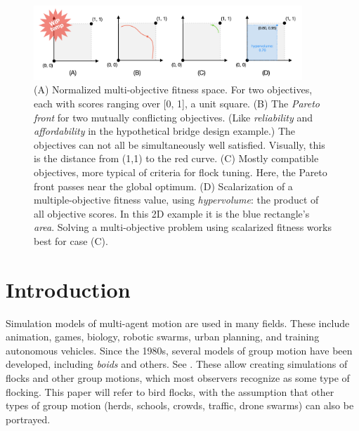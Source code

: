 \documentclass[letterpaper]{article}
\begin{document}


\begin{figure}[t]
    \centering
    \includegraphics[width=0.9\textwidth]{images/temp_MOF_HV.png}
    \caption{(A) Normalized multi-objective fitness space. For two objectives, each with scores ranging over [0, 1], a unit square. (B) The \textit{Pareto front} for two mutually conflicting objectives. (Like \textit{reliability} and \textit{affordability} in the hypothetical bridge design example.) The objectives can not all be simultaneously well satisfied. Visually, this is the distance from (1,1) to the red curve. (C) Mostly compatible objectives, more typical of criteria for flock tuning. Here, the Pareto front passes near the global optimum. (D) Scalarization of a multiple-objective fitness value, using \textit{hypervolume}: the product of all objective scores. In this 2D example it is the blue rectangle's \textit{area}. Solving a multi-objective problem using scalarized fitness works best for case (C).}
    \label{fig:MOF_HV}
\end{figure}


\section{Introduction}
\label{sec:intro}

Simulation models of multi-agent motion are used in many fields. These include animation, games, biology, robotic swarms, urban planning, and training autonomous vehicles. Since the 1980s, several models of group motion have been developed, including \textit{boids} and others. See . These allow creating simulations of flocks and other group motions, which most observers recognize as some type of flocking. This paper will refer to bird flocks, with the assumption that other types of group motion (herds, schools, crowds, traffic, drone swarms) can also be portrayed.
\end{document}

